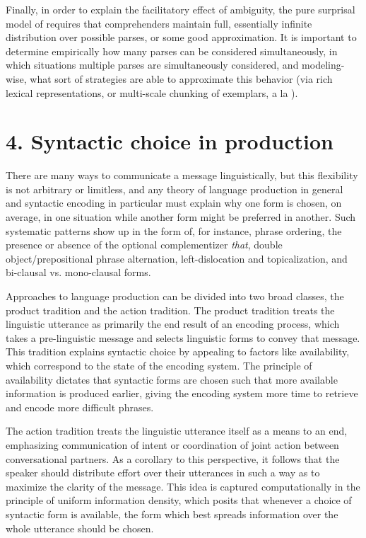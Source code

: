 \documentclass[11pt]{article}
\begin{document}
Finally, in order to explain the facilitatory effect of ambiguity, the pure surprisal model of  requires that comprehenders maintain full, essentially infinite distribution over possible parses, or some good approximation.  It is important to determine empirically how many parses can be considered simultaneously, in which situations multiple parses are simultaneously considered, and modeling-wise, what sort of strategies are able to approximate this behavior (via rich lexical representations, or multi-scale chunking of exemplars, a la ).


\pagebreak
\section*{4. Syntactic choice in production}
\label{sec:4.-syntactic-choice}


There are many ways to communicate a message linguistically, but this flexibility is not arbitrary or limitless, and any theory of language production in general and syntactic encoding in particular must explain why one form is chosen, on average, in one situation while another form might be preferred in another.  Such systematic patterns show up in the form of, for instance, phrase ordering, the presence or absence of the optional complementizer \emph{that}, double object/prepositional phrase alternation, left-dislocation and topicalization, and bi-clausal vs. mono-clausal forms.

Approaches to language production can be divided into two broad classes, the product tradition and the action tradition.  The product tradition treats the linguistic utterance as primarily the end result of an encoding process, which takes a pre-linguistic message and selects linguistic forms to convey that message.  This tradition explains syntactic choice by appealing to factors like availability, which correspond to the state of the encoding system.  The principle of availability dictates that syntactic forms are chosen such that more available information is produced earlier, giving the encoding system more time to retrieve and encode more difficult phrases.

The action tradition treats the linguistic utterance itself as a means to an end, emphasizing communication of intent or coordination of joint action between conversational partners.  As a corollary to this perspective, it follows that the speaker should distribute effort over their utterances in such a way as to maximize the clarity of the message.  This idea is captured computationally in the principle of uniform information density, which posits that whenever a choice of syntactic form is available, the form which best spreads information over the whole utterance should be chosen.
\end{document}
